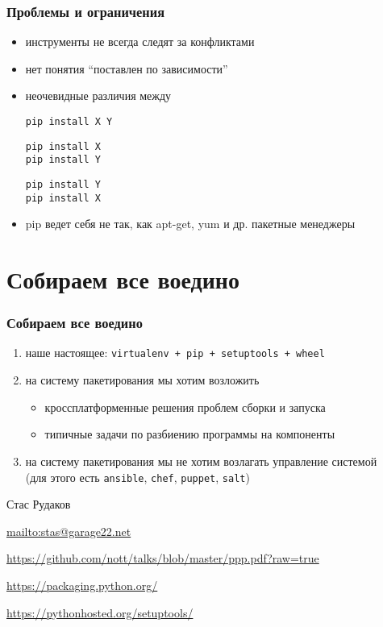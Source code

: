 \documentclass[10pt,pdf,utf8,russian,aspectratio=169,xcolor=dvipsnames,x11names,center]{beamer}
\begin{document}
\begin{frame}[fragile]
  \frametitle{Проблемы и ограничения}

  \begin{itemize}
  \item инструменты не всегда следят за конфликтами
  \item нет понятия ``поставлен по зависимости''
  \item неочевидные различия между
    \begin{lstlisting}[numbers=none]
pip install X Y
    \end{lstlisting}
    \begin{lstlisting}[numbers=none]
pip install X
pip install Y
    \end{lstlisting}
    \begin{lstlisting}[numbers=none]
pip install Y
pip install X
    \end{lstlisting}
  \item pip ведет себя не так, как apt-get, yum и др. пакетные менеджеры
  \end{itemize}

\end{frame}

\section{Собираем все воедино}

\begin{frame}
  \frametitle{Собираем все воедино}

  \begin{enumerate}
  \item наше настоящее: {\tt virtualenv + pip + setuptools + wheel}
  \item на систему пакетирования мы хотим возложить
    \begin{itemize}
    \item кроссплатформенные решения проблем сборки и запуска
    \item типичные задачи по разбиению программы на компоненты
    \end{itemize}
  \item на систему пакетирования мы не хотим возлагать управление системой\\
    (для этого есть {\tt ansible}, {\tt chef}, {\tt puppet}, {\tt salt})
  \end{enumerate}
\end{frame}

\begin{frame}
    \begin{block}{Стас Рудаков}
    \par \url{mailto:stas@garage22.net}
    \par \url{https://github.com/nott/talks/blob/master/ppp.pdf?raw=true}
    \end{block}

    \begin{block}
      \par \url{https://packaging.python.org/}
      \par \url{https://pythonhosted.org/setuptools/}
    \end{block}
    
\end{frame}
\end{document}

